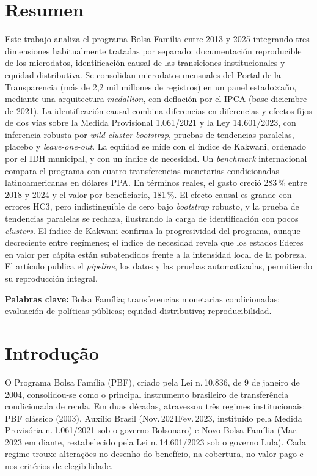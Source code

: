 \documentclass[12pt,a4paper,oneside]{article}
\begin{document}
\section*{Resumen}
\begin{singlespace}\small\noindent
Este trabajo analiza el programa Bolsa Família entre 2013 y 2025 integrando tres dimensiones habitualmente tratadas por separado: documentación reproducible de los microdatos, identificación causal de las transiciones institucionales y equidad distributiva. Se consolidan microdatos mensuales del Portal de la Transparencia (más de 2,2 mil millones de registros) en un panel estado$\times$año, mediante una arquitectura \textit{medallion}, con deflación por el IPCA (base diciembre de 2021). La identificación causal combina diferencias-en-diferencias y efectos fijos de dos vías sobre la Medida Provisional 1.061/2021 y la Ley 14.601/2023, con inferencia robusta por \textit{wild-cluster bootstrap}, pruebas de tendencias paralelas, placebo y \textit{leave-one-out}. La equidad se mide con el índice de Kakwani, ordenado por el IDH municipal, y con un índice de necesidad. Un \textit{benchmark} internacional compara el programa con cuatro transferencias monetarias condicionadas latinoamericanas en dólares PPA. En términos reales, el gasto creció 283\,\% entre 2018 y 2024 y el valor por beneficiario, 181\,\%. El efecto causal es grande con errores HC3, pero indistinguible de cero bajo \textit{bootstrap} robusto, y la prueba de tendencias paralelas se rechaza, ilustrando la carga de identificación con pocos \textit{clusters}. El índice de Kakwani confirma la progresividad del programa, aunque decreciente entre regímenes; el índice de necesidad revela que los estados líderes en valor per cápita están subatendidos frente a la intensidad local de la pobreza. El artículo publica el \textit{pipeline}, los datos y las pruebas automatizadas, permitiendo su reproducción integral.

\vspace{6pt}\noindent\textbf{Palabras clave:} Bolsa Família; transferencias monetarias condicionadas; evaluación de políticas públicas; equidad distributiva; reproducibilidad.
\end{singlespace}

\clearpage

\section{Introdução}\label{sec:intro}


O Programa Bolsa Família (PBF), criado pela Lei n.\,10.836, de 9 de
janeiro de 2004, consolidou-se como o principal instrumento brasileiro
de transferência condicionada de renda. Em duas décadas, atravessou
três regimes institucionais: PBF clássico (2003),
Auxílio Brasil (Nov.\,2021\textendash Fev.\,2023, instituído pela
Medida Provisória n.\,1.061/2021 sob o governo Bolsonaro) e Novo
Bolsa Família (Mar.\,2023 em diante, restabelecido pela Lei
n.\,14.601/2023 sob o governo Lula). Cada regime trouxe alterações
no desenho do benefício, na cobertura, no valor pago e nos critérios
de elegibilidade.
\end{document}
